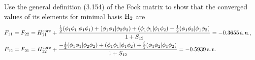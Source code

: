 \documentclass[a4paper]{book}
\newcounter{exercise}[chapter]
\newcommand{\core}{{\rm core}}
\newcommand{\au}{{\rm a.u.}}
\begin{document}
	\begin{exercise}
	Use the general definition (3.154) of the Fock matrix to show that the converged values of its elements for minimal basis $\ce{H2}$ are
	\begin{align*}
		F_{11} &= F_{22} = H^\core_{11} + \frac{ \frac{1}{2} ( \phi_1 \phi_1 | \phi_1 \phi_1 ) + ( \phi_1 \phi_1 | \phi_2 \phi_2 ) + ( \phi_1 \phi_1 | \phi_1 \phi_2 ) - \frac{1}{2} ( \phi_1 \phi_2 | \phi_1 \phi_2 ) }{ 1+S_{12} }  = -0.3655 \, \au , \\
		F_{12} &= F_{21} = H^\core_{12} + \frac{ -\frac{1}{2} ( \phi_1 \phi_1 | \phi_2 \phi_2 ) + ( \phi_1 \phi_1 | \phi_1 \phi_2 ) + \frac{3}{2} ( \phi_1 \phi_2 | \phi_1 \phi_2 ) }{ 1+S_{12} } = -0.5939 \, \au
	\end{align*}
	\end{exercise}
	
\end{document}
